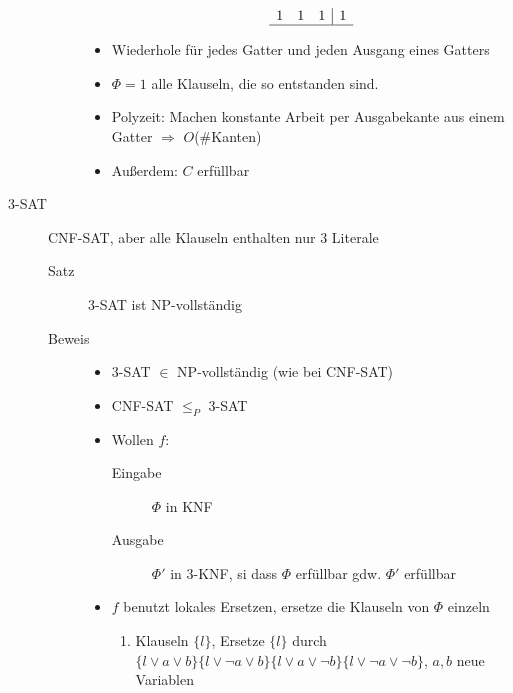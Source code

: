 \begin{description}
\begin{description}
\begin{itemize}
\[\begin{array}{ccc|cr}
            1   & 1   & 1   & 1 \\\cline{1-4}
        \end{array}
       \]
   \item Wiederhole für jedes Gatter und jeden Ausgang eines Gatters
   \item $\Phi = 1$ alle Klauseln, die so entstanden sind.
   \item Polyzeit: Machen konstante Arbeit per Ausgabekante aus einem Gatter $\Rightarrow$ $O$(\#{}Kanten)
   \item Außerdem: $C$ erfüllbar
  \end{itemize}
 \end{description}
 \item[3-SAT] CNF-SAT, aber alle Klauseln enthalten nur 3 Literale
     \begin{description}
      \item[Satz] 3-SAT ist NP-vollständig
      \item[Beweis]
      \begin{itemize}
       \item 3-SAT $\in$ NP-vollständig (wie bei CNF-SAT)
       \item CNF-SAT $\leq_P$ 3-SAT
       \item Wollen $f:$
           \begin{description}
            \item[Eingabe] $\Phi$ in KNF
            \item[Ausgabe] $\Phi'$ in 3-KNF, si dass $\Phi$ erfüllbar gdw. $\Phi'$ erfüllbar
           \end{description}
       \item $f$ benutzt lokales Ersetzen, ersetze die Klauseln von $\Phi$ einzeln
       \renewcommand{\theenumi}{\arabic{enumi}}
       \begin{enumerate}
        \item Klauseln $\{l\}$, Ersetze $\{l\}$ durch $\{l \lor a \lor b\}\{l \lor \neg a \lor b\}\{l \lor a \lor \neg b\}\{l \lor \neg a \lor \neg b\}$, $a,b$ neue Variablen

\end{enumerate}
\end{itemize}
\end{description}
\end{description}
